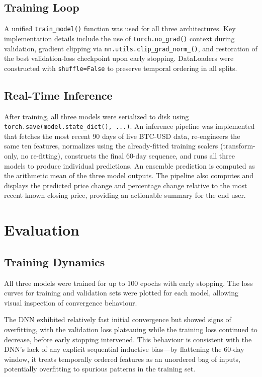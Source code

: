 \documentclass[12pt]{article}
\begin{document}
\subsection{Training Loop}

A unified \texttt{train\_model()} function was used for all three architectures. Key implementation details include the use of \texttt{torch.no\_grad()} context during validation, gradient clipping via \texttt{nn.utils.clip\_grad\_norm\_()}, and restoration of the best validation-loss checkpoint upon early stopping. DataLoaders were constructed with \texttt{shuffle=False} to preserve temporal ordering in all splits.

\subsection{Real-Time Inference}

After training, all three models were serialized to disk using \texttt{torch.save(model.state\_dict(), ...)}. An inference pipeline was implemented that fetches the most recent 90 days of live BTC-USD data, re-engineers the same ten features, normalizes using the already-fitted training scalers (transform-only, no re-fitting), constructs the final 60-day sequence, and runs all three models to produce individual predictions. An ensemble prediction is computed as the arithmetic mean of the three model outputs. The pipeline also computes and displays the predicted price change and percentage change relative to the most recent known closing price, providing an actionable summary for the end user.

\section{Evaluation}

\subsection{Training Dynamics}

All three models were trained for up to 100 epochs with early stopping. The loss curves for training and validation sets were plotted for each model, allowing visual inspection of convergence behaviour.

The DNN exhibited relatively fast initial convergence but showed signs of overfitting, with the validation loss plateauing while the training loss continued to decrease, before early stopping intervened. This behaviour is consistent with the DNN's lack of any explicit sequential inductive bias—by flattening the 60-day window, it treats temporally ordered features as an unordered bag of inputs, potentially overfitting to spurious patterns in the training set.
\end{document}

